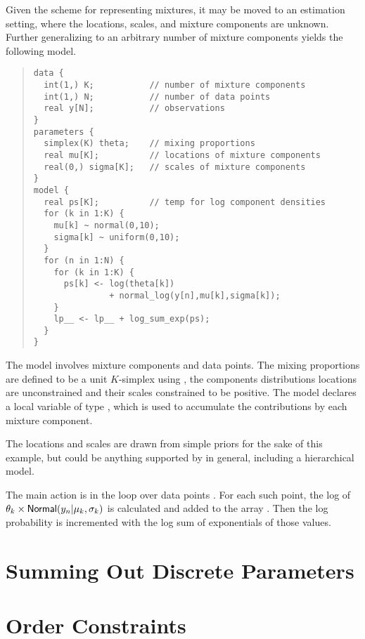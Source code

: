 Given the scheme for representing mixtures, it may be moved to an
estimation setting, where the locations, scales, and mixture
components are unknown.  Further generalizing to an arbitrary number
of mixture components yields the following model.
%
\begin{quote}
\begin{Verbatim}
data {
  int(1,) K;           // number of mixture components
  int(1,) N;           // number of data points
  real y[N];           // observations
}
parameters {
  simplex(K) theta;    // mixing proportions
  real mu[K];          // locations of mixture components
  real(0,) sigma[K];   // scales of mixture components
}
model {
  real ps[K];          // temp for log component densities
  for (k in 1:K) {
    mu[k] ~ normal(0,10);
    sigma[k] ~ uniform(0,10);
  }
  for (n in 1:N) {
    for (k in 1:K) {
      ps[k] <- log(theta[k]) 
               + normal_log(y[n],mu[k],sigma[k]);
    }
    lp__ <- lp__ + log_sum_exp(ps);    
  }
}
\end{Verbatim}
\end{quote}
%
The model involves  mixture components and  data
points.  The mixing proportions are defined to be a unit $K$-simplex
using , the components distributions locations
 are unconstrained and their scales 
constrained to be positive.  The model declares a local variable
 of type , which is used to accumulate the
contributions by each mixture component.

The locations and scales are drawn from simple priors for the sake of
this example, but could be anything supported by \Stan in general,
including a hierarchical model.  

The main action is in the loop over data points .  For each
such point, the log of $\theta_k \times
\mbox{\sf Normal}(y_n|\mu_k,\sigma_k)$ is calculated and added to the
array .  Then the log probability is incremented with the log
sum of exponentials of those values.

\chapter{Summing Out Discrete Parameters}



\chapter{Order Constraints}




